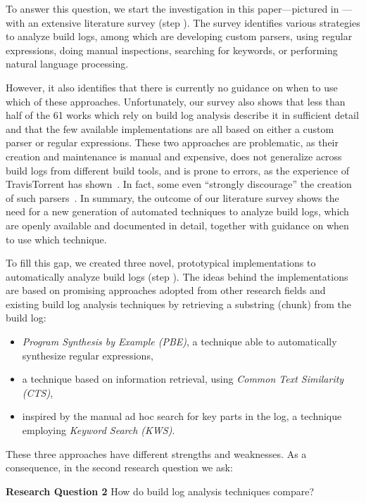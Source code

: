 To answer this question, we start the investigation in this paper---pictured in
---with an
extensive literature survey (step ).
The survey identifies various strategies to
analyze build logs, among which are developing
custom parsers, using regular expressions, doing manual inspections,
searching for keywords, or performing natural language processing.

However, it also identifies that there is currently no guidance on when to use which of these
approaches.
Unfortunately, our survey also shows that
less than half of the 61 works which rely on build log analysis
describe it in sufficient detail and that
the few available implementations are all based on either a custom parser
or regular expressions.
These two approaches are problematic, as their creation
and maintenance is manual and expensive, does not generalize across build
logs from different build tools, and is prone to errors,
as the experience of
TravisTorrent has
shown~\cite{beller2017travistorrent,travistorrentquestions}.
In fact, some even ``strongly discourage'' the creation of such
parsers~\cite{urli2018design}.
In summary, the outcome of our literature survey shows the need for a new
generation of automated techniques to analyze build logs, which are
openly available and documented in detail, together with
guidance on when to use which technique.

To fill this gap, we created three novel, prototypical
implementations to
automatically analyze build logs (step ).
The ideas behind the implementations are based on promising approaches
adopted from other research fields and existing build log analysis
techniques by retrieving a substring (chunk) from the build log:
\begin{itemize}
	\item \emph{Program Synthesis by Example (PBE)}, a technique
	able to
	automatically synthesize regular expressions,
	\item a technique based on information
	retrieval, using \emph{Common Text Similarity (CTS)},
	\item inspired by the manual ad hoc search for key parts in the
	log, a
	technique employing \emph{Keyword Search (KWS)}.
\end{itemize}

These three approaches have
different strengths and weaknesses.
As a consequence,
in the second research question we ask:

\begin{simplebox}[minipage boxed title*=-5cm]{\textbf{Research Question
2}}
How do build log analysis techniques compare?
\end{simplebox}

